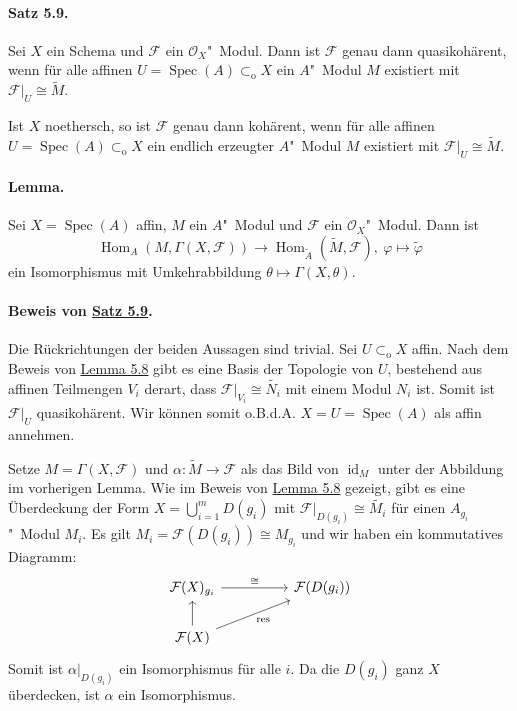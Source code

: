 \paragraph{Satz 5.9.}\label{5.9} Sei $X$ ein Schema und $\mathcal{F}$ ein $\mathcal{O}_X$"~Modul. Dann ist $\mathcal{F}$ genau dann quasikohärent, wenn für alle affinen $U=\operatorname{Spec}(A)\subset_\text{o}X$ ein $A$"~Modul $M$ existiert mit $\mathcal{F}|_U\cong\widetilde{M}$.

Ist $X$ noethersch, so ist $\mathcal{F}$ genau dann kohärent, wenn für alle affinen $U=\operatorname{Spec}(A)\subset_\text{o}X$ ein endlich erzeugter $A$"~Modul $M$ existiert mit $\mathcal{F}|_U\cong\widetilde{M}$.

\paragraph{Lemma.} Sei $X=\operatorname{Spec}(A)$ affin, $M$ ein $A$"~Modul und $\mathcal{F}$ ein $\mathcal{O}_X$"~Modul. Dann ist
\[\operatorname{Hom}_A(M,\Gamma(X,\mathcal{F}))\to\operatorname{Hom}_{\widetilde{A}}(\widetilde{M},\mathcal{F}),\ \varphi\mapsto\widetilde{\varphi} \]
ein Isomorphismus mit Umkehrabbildung $\theta\mapsto\Gamma(X,\theta)$.

\paragraph{Beweis von \hyperref[5.9]{Satz 5.9}.} Die Rückrichtungen der beiden Aussagen sind trivial. Sei $U\subset_\text{o}X$ affin. Nach dem Beweis von \hyperref[5.8]{Lemma 5.8} gibt es eine Basis der Topologie von $U$, bestehend aus affinen Teilmengen $V_i$ derart, dass $\mathcal{F}|_{V_i}\cong\widetilde{N_i}$ mit einem Modul $N_i$ ist. Somit ist $\mathcal{F}|_U$ quasikohärent. Wir können somit o.B.d.A. $X=U=\operatorname{Spec}(A)$ als affin annehmen.

Setze $M=\Gamma(X,\mathcal{F})$ und $\alpha:\widetilde{M}\to\mathcal{F}$ als das Bild von $\operatorname{id}_M$ unter der Abbildung im vorherigen Lemma. Wie im Beweis von \hyperref[5.8]{Lemma 5.8} gezeigt, gibt es eine Überdeckung der Form $X=\bigcup_{i=1}^mD(g_i)$ mit $\mathcal{F}|_{D(g_i)}\cong\widetilde{M_i}$ für einen $A_{g_i}$"~Modul $M_i$. Es gilt $M_i=\mathcal{F}(D(g_i))\cong M_{g_i}$ und wir haben ein kommutatives Diagramm:
\[\begin{tikzcd}
\mathcal{F}(X)_{g_i}\ar[rr, "\cong"] && \mathcal{F}(D(g_i))\\
\mathcal{F}(X)\ar[u]\ar[urr, "\operatorname{res}"']
\end{tikzcd} \]
Somit ist $\alpha|_{D(g_i)}$ ein Isomorphismus für alle $i$. Da die $D(g_i)$ ganz $X$ überdecken, ist $\alpha$ ein Isomorphismus.

